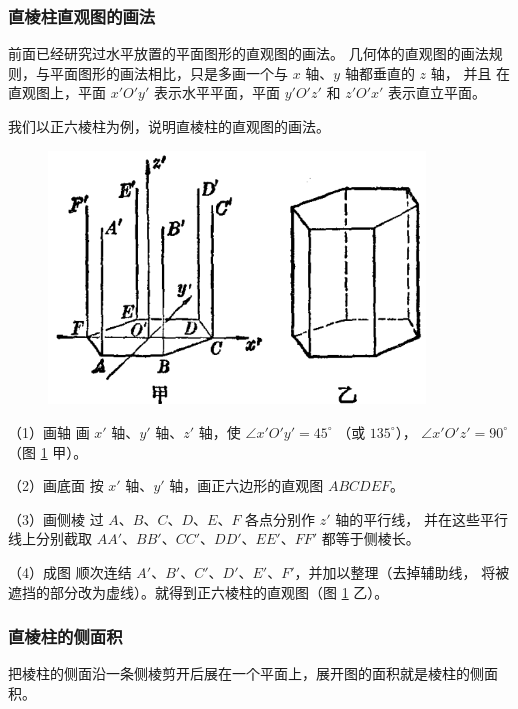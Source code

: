 \subsubsection{直棱柱直观图的画法}

前面已经研究过水平放置的平面图形的直观图的画法。
几何体的直观图的画法规则，与平面图形的画法相比，只是多画一个与 $x$ 轴、$y$ 轴都垂直的 $z$ 轴，
并且
在直观图上，平面 $x'O'y'$ 表示水平平面，平面 $y'O'z'$ 和 $z'O'x'$ 表示直立平面。

我们以正六棱柱为例，说明直棱柱的直观图的画法。

\begin{figure}[htbp]
    \centering
    \includegraphics[width=10cm]{../pic/ltjh-ch2-08.png}
    \caption{}\label{fig:ltjh-2-8}
\end{figure}

\huafa （1）画轴 \quad 画 $x'$ 轴、$y'$ 轴、$z'$ 轴，使 $\angle x'O'y'=45^\circ$
（或 $135^\circ$）， $\angle x'O'z' = 90^\circ$ （图 \ref{fig:ltjh-2-8} 甲）。

（2）画底面 \quad 按 $x'$ 轴、$y'$ 轴，画正六边形的直观图 $ABCDEF$。

（3）画侧棱 \quad 过 $A$、$B$、$C$、$D$、$E$、$F$ 各点分别作 $z'$ 轴的平行线，
并在这些平行线上分别截取 $AA'$、$BB'$、$CC'$、$DD'$、$EE'$、$FF'$ 都等于侧棱长。

（4）成图 \quad 顺次连结 $A'$、$B'$、$C'$、$D'$、$E'$、$F'$，并加以整理（去掉辅助线，
将被遮挡的部分改为虚线）。就得到正六棱柱的直观图（图 \ref{fig:ltjh-2-8} 乙）。


\subsubsection{直棱柱的侧面积}

把棱柱的侧面沿一条侧棱剪开后展在一个平面上，展开图的面积就是棱柱的侧面积。


